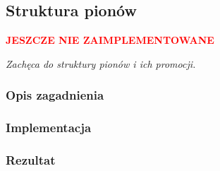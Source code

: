 \subsection{Struktura pionów}
\label{subsec:struktura-pionow}
\begin{center}
    \textcolor{red}{\textbf{JESZCZE NIE ZAIMPLEMENTOWANE}}
\end{center}
\textit{Zachęca do struktury pionów i ich promocji.}

\subsubsection{Opis zagadnienia}
\subsubsection{Implementacja}
\subsubsection{Rezultat}